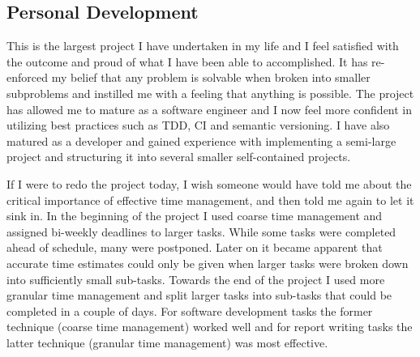 
\subsection{Personal Development}

This is the largest project I have undertaken in my life and I feel satisfied with the outcome and proud of what I have been able to accomplished. It has re-enforced my belief that any problem is solvable when broken into smaller subproblems and instilled me with a feeling that anything is possible. The project has allowed me to mature as a software engineer and I now feel more confident in utilizing best practices such as TDD, CI and semantic versioning. I have also matured as a developer and gained experience with implementing a semi-large project and structuring it into several smaller self-contained projects.

If I were to redo the project today, I wish someone would have told me about the critical importance of effective time management, and then told me again to let it sink in. In the beginning of the project I used coarse time management and assigned bi-weekly deadlines to larger tasks. While some tasks were completed ahead of schedule, many were postponed. Later on it became apparent that accurate time estimates could only be given when larger tasks were broken down into sufficiently small sub-tasks. Towards the end of the project I used more granular time management and split larger tasks into sub-tasks that could be completed in a couple of days. For software development tasks the former technique (coarse time management) worked well and for report writing tasks the latter technique (granular time management) was most effective.

